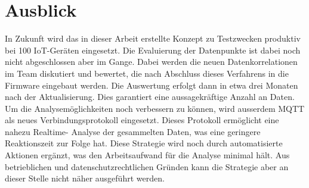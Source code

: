 \chapter{Ausblick}
In Zukunft wird das in dieser Arbeit erstellte Konzept zu Testzwecken produktiv bei 100
IoT-Geräten eingesetzt. Die Evaluierung der Datenpunkte ist dabei noch nicht abgeschlossen
aber im Gange. Dabei werden die neuen Datenkorrelationen im Team diskutiert
und bewertet, die nach Abschluss dieses Verfahrens in die Firmware eingebaut
werden. Die Auswertung erfolgt dann in etwa drei Monaten nach der Aktualisierung. Dies
garantiert eine aussagekräftige Anzahl an Daten.
Um die Analysemöglichkeiten noch verbessern zu können, wird ausserdem MQTT als
neues Verbindungsprotokoll eingesetzt. Dieses Protokoll ermöglicht eine nahezu Realtime-
Analyse der gesammelten Daten, was eine geringere Reaktionszeit zur Folge hat. Diese
Strategie wird noch durch automatisierte Aktionen ergänzt, was den Arbeitsaufwand für
die Analyse minimal hält. Aus betrieblichen und datenschutzrechtlichen Gründen kann
die Strategie aber an dieser Stelle nicht näher ausgeführt werden.

